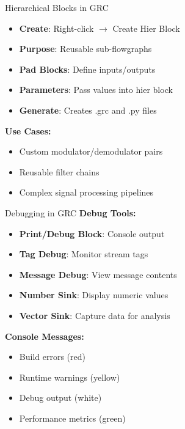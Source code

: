 \documentclass[aspectratio=169,11pt]{beamer}
\begin{document}
\begin{frame}{Hierarchical Blocks in GRC}
\begin{itemize}
    \item \textbf{Create}: Right-click $\rightarrow$ Create Hier Block
    \item \textbf{Purpose}: Reusable sub-flowgraphs
    \item \textbf{Pad Blocks}: Define inputs/outputs
    \item \textbf{Parameters}: Pass values into hier block
    \item \textbf{Generate}: Creates .grc and .py files
\end{itemize}

\textbf{Use Cases:}
\begin{itemize}
    \item Custom modulator/demodulator pairs
    \item Reusable filter chains
    \item Complex signal processing pipelines
\end{itemize}
\end{frame}

\begin{frame}{Debugging in GRC}
\textbf{Debug Tools:}
\begin{itemize}
    \item \textbf{Print/Debug Block}: Console output
    \item \textbf{Tag Debug}: Monitor stream tags
    \item \textbf{Message Debug}: View message contents
    \item \textbf{Number Sink}: Display numeric values
    \item \textbf{Vector Sink}: Capture data for analysis
\end{itemize}

\textbf{Console Messages:}
\begin{itemize}
    \item Build errors (red)
    \item Runtime warnings (yellow)
    \item Debug output (white)
    \item Performance metrics (green)
\end{itemize}
\end{frame}
\end{document}
